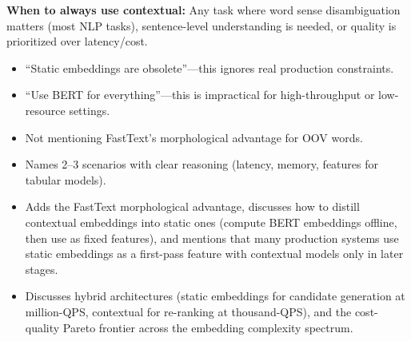 \begin{interviewq}
\textbf{When to always use contextual:} Any task where word sense disambiguation matters (most NLP tasks), sentence-level understanding is needed, or quality is prioritized over latency/cost.

\redflags
\begin{itemize}
    \item ``Static embeddings are obsolete''---this ignores real production constraints.
    \item ``Use BERT for everything''---this is impractical for high-throughput or low-resource settings.
    \item Not mentioning FastText's morphological advantage for OOV words.
\end{itemize}


\goodgreat
\begin{itemize}
    \item {} Names 2--3 scenarios with clear reasoning (latency, memory, features for tabular models).
    \item {} Adds the FastText morphological advantage, discusses how to distill contextual embeddings into static ones (compute BERT embeddings offline, then use as fixed features), and mentions that many production systems use static embeddings as a first-pass feature with contextual models only in later stages.
    \item {} Discusses hybrid architectures (static embeddings for candidate generation at million-QPS, contextual for re-ranking at thousand-QPS), and the cost-quality Pareto frontier across the embedding complexity spectrum.
\end{itemize}

\end{interviewq}


